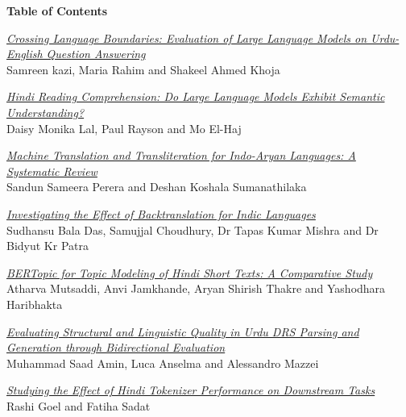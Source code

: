 \setlength{\parindent}{0in}
\setlength{\parskip}{2ex}

\begin{center}
  {\Large \bf Table of Contents}
\end{center}

\vspace*{0.5cm}
\hyperlink{page.1}{\em Crossing Language Boundaries: Evaluation of Large Language Models on Urdu-English Question Answering}\samepage \\
\hspace*{7mm} Samreen kazi, Maria Rahim and Shakeel Ahmed Khoja\dotfill {}

\hyperlink{page.12}{\em Hindi Reading Comprehension: Do Large Language Models Exhibit Semantic Understanding?}\samepage \\
\hspace*{7mm} Daisy Monika Lal, Paul Rayson and Mo El-Haj\dotfill {}

\hyperlink{page.23}{\em Machine Translation and Transliteration for Indo-Aryan Languages: A Systematic Review}\samepage \\
\hspace*{7mm} Sandun Sameera Perera and Deshan Koshala Sumanathilaka\dotfill {}

\hyperlink{page.34}{\em Investigating the Effect of Backtranslation for Indic Languages}\samepage \\
\hspace*{7mm} Sudhansu Bala Das, Samujjal Choudhury, Dr Tapas Kumar Mishra and Dr Bidyut Kr Patra\dotfill {}

\hyperlink{page.49}{\em BERTopic for Topic Modeling of Hindi Short Texts: A Comparative Study}\samepage \\
\hspace*{7mm} Atharva Mutsaddi, Anvi Jamkhande, Aryan Shirish Thakre and Yashodhara Haribhakta\dotfill {}

\hyperlink{page.60}{\em Evaluating Structural and Linguistic Quality in Urdu DRS Parsing and Generation through Bidirectional Evaluation}\samepage \\
\hspace*{7mm} Muhammad Saad Amin, Luca Anselma and Alessandro Mazzei\dotfill {}

\hyperlink{page.71}{\em Studying the Effect of Hindi Tokenizer Performance on Downstream Tasks}\samepage \\
\hspace*{7mm} Rashi Goel and Fatiha Sadat\dotfill {}

